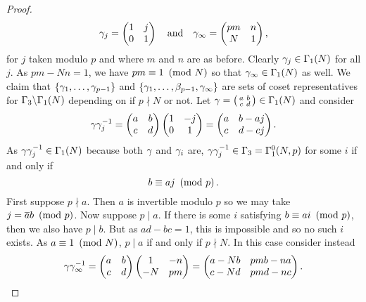 \begin{proof}
        \[
          \gamma_{j} = \begin{pmatrix} 1 & j \\ 0 & 1 \end{pmatrix} \quad \text{and} \quad \gamma_{\infty} = \begin{pmatrix} pm & n \\ N & 1 \end{pmatrix},
        \]
        for $j$ taken modulo $p$ and where $m$ and $n$ are as before. Clearly $\gamma_{j} \in \Gamma_{1}(N)$ for all $j$. As $pm-Nn = 1$, we have $pm \equiv 1 \ \left(\text{mod }N\right)$ so that $\gamma_{\infty} \in \Gamma_{1}(N)$ as well. We claim that $\{\gamma_{1},\ldots,\gamma_{p-1}\}$ and $\{\gamma_{1},\ldots,\beta_{p-1},\gamma_{\infty}\}$ are sets of coset representatives for $\Gamma_{3}\backslash\Gamma_{1}(N)$ depending on if $p \nmid N$ or not. Let $\gamma = \begin{psmallmatrix} a & b \\ c & d \end{psmallmatrix} \in \Gamma_{1}(N)$ and consider
        \[
          \gamma\gamma_{j}^{-1} = \begin{pmatrix} a & b \\ c & d \end{pmatrix}\begin{pmatrix} 1 & -j \\ 0 & 1 \end{pmatrix} = \begin{pmatrix} a & b-aj \\ c & d-cj \end{pmatrix}.
        \]
        As $\gamma\gamma_{j}^{-1} \in \Gamma_{1}(N)$ because both $\gamma$ and $\gamma_{i}$ are, $\gamma\gamma_{j}^{-1} \in \Gamma_{3} = \Gamma_{1}^{0}(N,p)$ for some $i$ if and only if
        \[
          b \equiv aj \ \left(\text{mod }p\right).
        \]
        First suppose $p \nmid a$. Then $a$ is invertible modulo $p$ so we may take $j = \overline{a}b \ \left(\text{mod }p\right)$. Now suppose $p \mid a$. If there is some $i$ satisfying $b \equiv ai \ \left(\text{mod }p\right)$, then we also have $p \mid b$. But as $ad-bc = 1$, this is impossible and so no such $i$ exists. As $a \equiv 1 \ \left(\text{mod }N\right)$, $p \mid a$ if and only if $p \nmid N$. In this case consider instead
        \[
          \gamma\gamma_{\infty}^{-1} = \begin{pmatrix} a & b \\ c & d \end{pmatrix}\begin{pmatrix} 1 & -n \\ -N & pm \end{pmatrix} = \begin{pmatrix} a-Nb & pmb-na \\ c-Nd & pmd-nc \end{pmatrix}.
\]
\end{proof}
